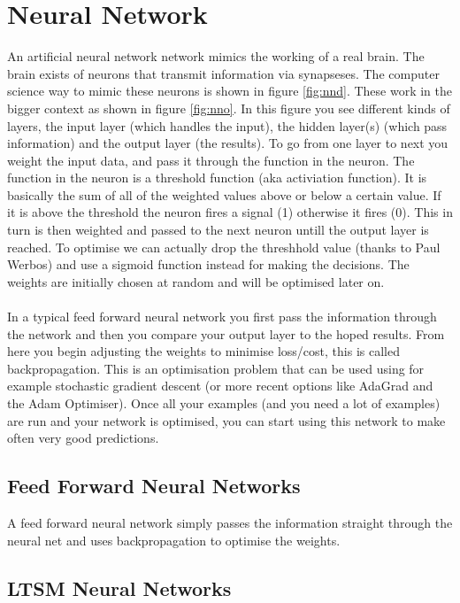 \chapter{Neural Network}

An artificial neural network network mimics the working of a real brain. The brain exists of neurons that transmit information via synapseses. The computer science way to mimic these neurons is shown in figure \ref{fig:nnd}. These work in the bigger context as shown in figure \ref{fig:nno}. In this figure you see different kinds of layers, the input layer (which handles the input), the hidden layer(s) (which pass information) and the output layer (the results). To go from one layer to next you weight the input data, and pass it through the function in the neuron. The function in the neuron is a threshold function (aka activiation function). It is basically the sum of all of the weighted values above or below a certain value. If it is above the threshold the neuron fires a signal (1) otherwise it fires (0). This in turn is then weighted and passed to the next neuron untill the output layer is reached. To optimise we can actually drop the threshhold value (thanks to Paul Werbos) and use a sigmoid function instead for making the decisions. The weights are initially chosen at random and will be optimised later on.
\\\\
In a typical feed forward neural network you first pass the information through the network and then you compare your output layer to the hoped results. From here you begin adjusting the weights to minimise loss/cost, this is called backpropagation. This is an optimisation problem that can be used using for example stochastic gradient descent (or more recent options like AdaGrad and the Adam Optimiser). Once all your examples (and you need a lot of examples) are run and your network is optimised, you can start using this network to make often very good predictions.

\section{Feed Forward Neural Networks}
A feed forward neural network simply passes the information straight through the neural net and uses backpropagation to optimise the weights.

\section{LTSM Neural Networks}


